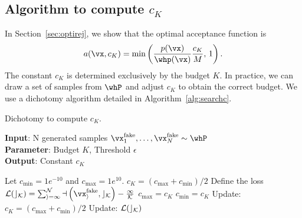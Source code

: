 \documentclass[twoside]{article}
\begin{document}
\subsection{Algorithm to compute $c_K$} \label{app:subsec:algoc}
In Section~\ref{sec:optirej},  we show that the optimal acceptance function is
\begin{align}
a(\vx, c_K) =\min\left(\frac{p(\vx)}{\whp(\vx)}\frac{c_K}{M}, \, 1\right).
\end{align}
The constant $c_K$ is determined exclusively by the budget $K$. In practice, we can draw a set of samples from $\whP$ and adjust $c_K$ to obtain the correct budget. We use a dichotomy algorithm detailed in Algorithm~\ref{alg:searchc}.
\begin{algorithm}[H]
\caption{Dichotomy to compute $c_K$.}
\label{alg:searchc}
\textbf{Input}: N generated samples $\vx^{\mathrm{fake}}_1, \dots, \vx^{\mathrm{fake}}_N\sim \whP$ \\
\textbf{Parameter}: Budget $K$, Threshold $\epsilon$\\
\textbf{Output}: Constant $c_K$
\begin{algorithmic}[1] \State Let $c_{\mathrm{min}}=1e^{-10}$ and $c_{\mathrm{max}}=1e^{10}$.
\State $c_K = (c_{\mathrm{max}}+c_{\mathrm{min}})/2$
\State Define the loss $\cal L(c_K) = \sum_{i=1}^Na\left(\vx_i^{\mathrm{fake}}, c_K\right)-\frac{1}{K}$
\State $c_{\mathrm{max}}=c_K$
\State $c_{\mathrm{min}}=c_K$
\EndIf
\State Update: $c_K = (c_{\mathrm{max}}+c_{\mathrm{min}})/2$
\State Update: $\cal L(c_K)$

\EndWhile

\end{algorithmic}
\end{algorithm}
\end{document}
